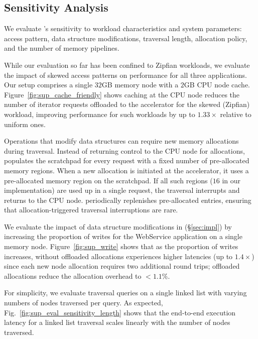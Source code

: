\subsection{\pulse Sensitivity Analysis}
\label{ssec:sensitivity}


We evaluate \pulse's sensitivity to workload characteristics and system parameters: access pattern, data structure modifications, traversal length, allocation policy, and the number of \pulse memory pipelines. 


While our evaluation so far has been confined to Zipfian workloads, we evaluate the impact of skewed access patterns on \pulse performance for all three applications. Our setup comprises a single $32$GB memory node with a $2$GB CPU node cache. Figure~\ref{fig:sup_cache_friendly} shows caching at the CPU node reduces the number of iterator requests offloaded to the \pulse accelerator for the skewed (Zipfian) workload, improving \pulse performance for such workloads by up to $1.33\times$ relative to uniform ones.

 Operations that modify data structures can require new memory allocations during traversal. Instead of returning control to the CPU node for allocations, \pulse populates the scratchpad for every request with a fixed number of pre-allocated memory regions. When a new allocation is initiated at the \pulse accelerator, it uses a pre-allocated memory region on the scratchpad. If all such regions ($16$ in our implementation) are used up in a single request, the traversal interrupts and returns to the CPU node. \pulse periodically replenishes pre-allocated entries, ensuring that allocation-triggered traversal interruptions are rare.

We evaluate the impact of data structure modifications in \pulse (\S\ref{sec:impl}) by increasing the proportion of writes for the WebService application on a single memory node. Figure~\ref{fig:sup_write} shows that as the proportion of writes increases, \pulse without offloaded allocations experiences higher latencies (up to $1.4\times$) since each new node allocation requires two additional round trips; offloaded allocations reduce the allocation overhead to $<1.1\%$.

 For simplicity, we evaluate traversal queries on a single linked list with varying numbers of nodes traversed per query. As expected, Fig.~\ref{fig:sup_eval_sensitivity_length} shows that the end-to-end execution latency for a linked list traversal scales linearly with the number of nodes traversed.

